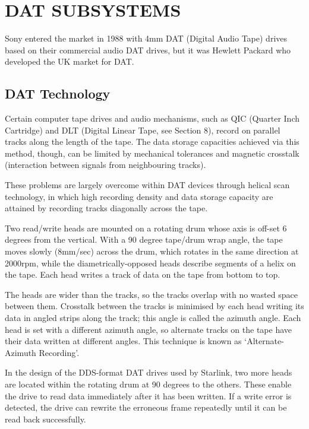 \section {DAT SUBSYSTEMS}

Sony entered the market in 1988 with 4mm DAT (Digital Audio Tape) drives based
on their commercial audio DAT drives, but it was Hewlett Packard who developed
the UK market for DAT.

\subsection {DAT Technology}

Certain computer tape drives and audio mechanisms, such as QIC (Quarter
Inch Cartridge) and DLT (Digital Linear Tape, see Section 8), record on
parallel tracks along the length of the tape. The data storage capacities
achieved via this method, though, can be limited by mechanical tolerances
and magnetic crosstalk (interaction between signals from neighbouring tracks).

These problems are largely overcome within DAT devices through helical scan
technology, in which high recording density and data storage capacity are
attained by recording tracks diagonally across the tape.

Two read/write heads are mounted on a rotating drum whose axis is off-set
6 degrees from the vertical. With a 90 degree tape/drum wrap angle, the tape
moves slowly (8mm/sec) across the drum, which rotates in the same direction
at 2000rpm, while the diametrically-opposed heads describe segments of a
helix on the tape. Each head writes a track of data on the tape from bottom
to top.

The heads are wider than the tracks, so the tracks overlap with no wasted
space between them. Crosstalk between the tracks is minimised by each head
writing its data in angled strips along the track; this angle is called the
azimuth angle. Each head is set with a different azimuth angle, so alternate
tracks on the tape have their data written at different angles. This
technique is known as `Alternate-Azimuth Recording'.

In the design of the DDS-format DAT drives used by Starlink, two more heads
are located within the rotating drum at 90 degrees to the others. These
enable the drive to read data immediately after it has been written. If a
write error is detected, the drive can rewrite the erroneous frame repeatedly
until it can be read back successfully.

